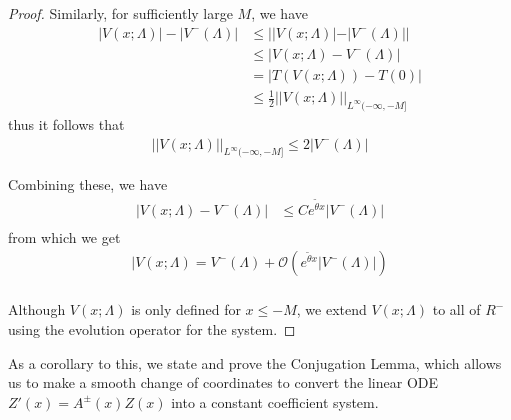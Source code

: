 \documentclass[thesis.tex]{subfiles}
\begin{document}
\begin{lemma}
\begin{proof}
Similarly, for sufficiently large $M$, we have
\begin{align*}
|V(x; \Lambda)| - |V^-(\Lambda)| &\leq | |V(x; \Lambda)| - |V^-(\Lambda)| | \\
&\leq |V(x; \Lambda) - V^-(\Lambda)| \\
&= |T(V(x; \Lambda)) - T(0)| \\
&\leq \frac{1}{2} ||V(x; \Lambda)||_{L^\infty(-\infty, -M]}
\end{align*}
thus it follows that
\begin{align*}
||V(x; \Lambda)||_{L^\infty(-\infty, -M]} \leq 2 |V^-(\Lambda)|
\end{align*}

Combining these, we have
\begin{align*}
|V(x; \Lambda) - V^-(\Lambda)| &\leq C e^{\tilde{\theta} x}|V^-(\Lambda)| \\
\end{align*}
from which we get
\begin{align*}
|V(x; \Lambda) = V^-(\Lambda) + \mathcal{O}( e^{\tilde{\theta} x}|V^-(\Lambda)| )\\
\end{align*}

Although $V(x; \Lambda)$ is only defined for $x \leq -M$, we extend $V(x; \Lambda)$ to all of $R^-$ using the evolution operator for the system.
\end{proof}
\end{lemma}

As a corollary to this, we state and prove the Conjugation Lemma, which allows us to make a smooth change of coordinates to convert the linear ODE $Z'(x) = A^\pm(x) Z(x)$ into a constant coefficient system.
\end{document}
